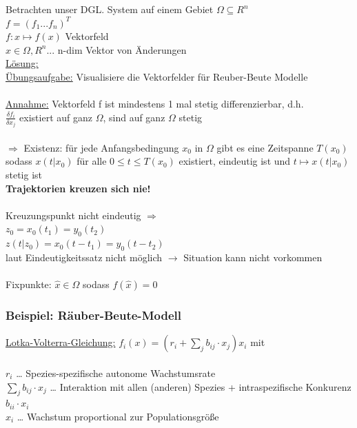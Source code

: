 Betrachten unser DGL. System auf einem Gebiet $\Omega \subseteq R^n$\\
$f=(f_1 ... f_n)^T$\\
$f : x \mapsto f(x)$ Vektorfeld\\
$x \in \Omega, R^n $... n-dim Vektor von Änderungen\\

\underline{Lösung:}\\

\underline{Übungsaufgabe:} Visualisiere die Vektorfelder für Reuber-Beute Modelle\\\\

\underline{Annahme:} Vektorfeld f ist mindestens 1 mal stetig differenzierbar, d.h.\\
$\frac{\delta f_i}{\delta x_j}$ existiert auf ganz $\Omega$, sind auf ganz $\Omega$ stetig\\\\

$\Rightarrow$ Existenz: für jede Anfangsbedingung $x_0$ in $\Omega$ gibt es eine Zeitspanne $T(x_0)$ sodass $x(t|x_0)$ für alle $0 \leq t \leq T(x_0)$ existiert, eindeutig ist und $t \mapsto x(t|x_0)$ stetig ist\\

\textbf{Trajektorien kreuzen sich nie!}\\\\

Kreuzungspunkt nicht eindeutig $\Rightarrow$\\
$z_0=x_0(t_1)=y_0(t_2)$\\
$z(t|z_0)=x_0(t-t_1)=y_0(t-t_2)$\\
laut Eindeutigkeitssatz nicht möglich $\rightarrow$ Situation kann nicht vorkommen\\\\

Fixpunkte: $\hat{x} \in \Omega$ sodass $f(\hat{x})=0$\\

\subsubsection{Beispiel: Räuber-Beute-Modell}

\underline{Lotka-Volterra-Gleichung:} $f_i(x)=(r_i + \sum_{j} b_{ij} \cdot x_j) x_i$ mit\\\\
$r_i$ … Spezies-spezifische autonome Wachstumsrate\\
$\sum_{j} b_{ij} \cdot x_j$ … Interaktion mit allen (anderen) Spezies + intraspezifische Konkurenz $b_{ii}\cdot x_i$\\
$x_i$ … Wachstum proportional zur Populationsgröße\\

